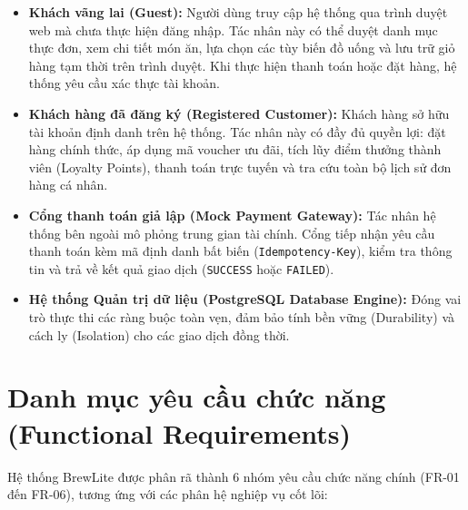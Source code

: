 \documentclass[12pt,a4paper,oneside]{report}
\begin{document}
\begin{itemize}
    \item \textbf{Khách vãng lai (Guest):} Người dùng truy cập hệ thống qua trình duyệt web mà chưa thực hiện đăng nhập. Tác nhân này có thể duyệt danh mục thực đơn, xem chi tiết món ăn, lựa chọn các tùy biến đồ uống và lưu trữ giỏ hàng tạm thời trên trình duyệt. Khi thực hiện thanh toán hoặc đặt hàng, hệ thống yêu cầu xác thực tài khoản.
    \item \textbf{Khách hàng đã đăng ký (Registered Customer):} Khách hàng sở hữu tài khoản định danh trên hệ thống. Tác nhân này có đầy đủ quyền lợi: đặt hàng chính thức, áp dụng mã voucher ưu đãi, tích lũy điểm thưởng thành viên (Loyalty Points), thanh toán trực tuyến và tra cứu toàn bộ lịch sử đơn hàng cá nhân.
    \item \textbf{Cổng thanh toán giả lập (Mock Payment Gateway):} Tác nhân hệ thống bên ngoài mô phỏng trung gian tài chính. Cổng tiếp nhận yêu cầu thanh toán kèm mã định danh bất biến (\texttt{Idempotency-Key}), kiểm tra thông tin và trả về kết quả giao dịch (\texttt{SUCCESS} hoặc \texttt{FAILED}).
    \item \textbf{Hệ thống Quản trị dữ liệu (PostgreSQL Database Engine):} Đóng vai trò thực thi các ràng buộc toàn vẹn, đảm bảo tính bền vững (Durability) và cách ly (Isolation) cho các giao dịch đồng thời.
\end{itemize}

\section{Danh mục yêu cầu chức năng (Functional Requirements)}
Hệ thống BrewLite được phân rã thành 6 nhóm yêu cầu chức năng chính (FR-01 đến FR-06), tương ứng với các phân hệ nghiệp vụ cốt lõi:
\end{document}
